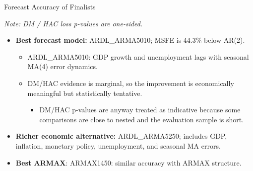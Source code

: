 \documentclass[aspectratio=169,10pt]{beamer}
\newcommand{\smallnote}[1]{%
  \par\vspace{0.05cm}%
  \noindent
  \begin{minipage}{0.96\linewidth}
    \raggedright\scriptsize\itshape #1
  \end{minipage}%
}
\begin{document}
\begin{frame}{Forecast Accuracy of Finalists}
\centering
{}
\smallnote{Note: DM / HAC loss p-values are one-sided.}
\vspace{0.15cm}
\begin{itemize}
    \item \textbf{Best forecast model:} ARDL\_ARMA5010; MSFE is 44.3\% below AR(2).
    \begin{itemize}
        \item ARDL\_ARMA5010: GDP growth and unemployment lags with seasonal MA(4) error dynamics.
        \item DM/HAC evidence is marginal, so the improvement is economically meaningful but statistically tentative.
        \begin{itemize}
            \item DM/HAC p-values are anyway treated as indicative because some comparisons are close to nested and the evaluation sample is short.
        \end{itemize}
    \end{itemize}
    \item \textbf{Richer economic alternative:} ARDL\_ARMA5250; includes GDP, inflation, monetary policy, unemployment, and seasonal MA errors.
    \item \textbf{Best ARMAX}: ARMAX1450: similar accuracy with ARMAX structure.
\end{itemize}
\end{frame}
\end{document}
